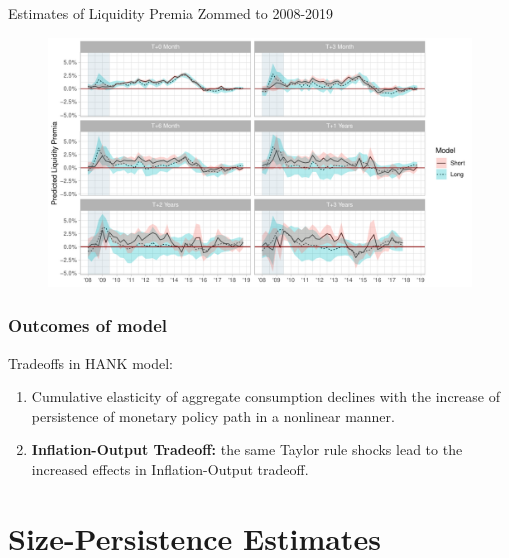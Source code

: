 \documentclass[10pt,aspectratio=169]{beamer}
\begin{document}
\begin{frame}{Estimates of Liquidity Premia Zommed to 2008-2019}
    \begin{figure}\centering 
        \begin{minipage}{0.87\textwidth}\centering
        \includegraphics[width=\textwidth]{estimates_of_liquidity_premia_plot_2008.pdf}
        \end{minipage}
    \end{figure}
\end{frame}


\begin{frame}
\end{frame}


\begin{frame}\frametitle{Outcomes of \cite{KMV2018} model}
    \cite{KMV2018} Tradeoffs in HANK model:
    \begin{enumerate}
        \item \textbf{} Cumulative elasticity of aggregate consumption declines with the increase of persistence of monetary policy path in a nonlinear manner.
        \item \color{gray}\textbf{Inflation-Output Tradeoff:} the same Taylor rule shocks lead to the increased effects in Inflation-Output tradeoff.
    \end{enumerate}  
\end{frame}




\section{Size-Persistence Estimates}
\end{document}
